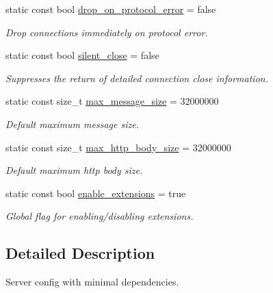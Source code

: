 \begin{DoxyCompactItemize}
\item 
static const bool \hyperlink{structwebsocketpp_1_1config_1_1minimal__server_aab09bf45ad78310426a04636ad64c2bd}{drop\+\_\+on\+\_\+protocol\+\_\+error} = false
\begin{DoxyCompactList}\small\item\em Drop connections immediately on protocol error. \end{DoxyCompactList}\item 
static const bool \hyperlink{structwebsocketpp_1_1config_1_1minimal__server_a2628ceea7ff3671afac22317f979e9c1}{silent\+\_\+close} = false
\begin{DoxyCompactList}\small\item\em Suppresses the return of detailed connection close information. \end{DoxyCompactList}\item 
static const size\+\_\+t \hyperlink{structwebsocketpp_1_1config_1_1minimal__server_adfad5099419b8e2090c3667d17e10008}{max\+\_\+message\+\_\+size} = 32000000
\begin{DoxyCompactList}\small\item\em Default maximum message size. \end{DoxyCompactList}\item 
static const size\+\_\+t \hyperlink{structwebsocketpp_1_1config_1_1minimal__server_a56756239e0904949156e630c1f48d95e}{max\+\_\+http\+\_\+body\+\_\+size} = 32000000
\begin{DoxyCompactList}\small\item\em Default maximum http body size. \end{DoxyCompactList}\item 
static const bool \hyperlink{structwebsocketpp_1_1config_1_1minimal__server_ae25bd7e239136a81b9756d6be0818466}{enable\+\_\+extensions} = true\hypertarget{structwebsocketpp_1_1config_1_1minimal__server_ae25bd7e239136a81b9756d6be0818466}{}\label{structwebsocketpp_1_1config_1_1minimal__server_ae25bd7e239136a81b9756d6be0818466}

\begin{DoxyCompactList}\small\item\em Global flag for enabling/disabling extensions. \end{DoxyCompactList}\end{DoxyCompactItemize}


\subsection{Detailed Description}
Server config with minimal dependencies. 

